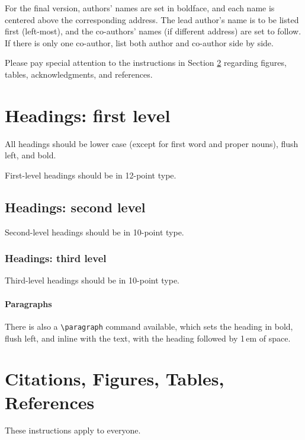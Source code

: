 \documentclass{article}
\begin{document}
For the final version, authors' names are set in boldface, and each name is centered above the corresponding address. The lead author's name is to be listed first (left-most), and the co-authors' names (if different address) are set to follow. If there is only one co-author, list both author and co-author side by side.

Please pay special attention to the instructions in Section \ref{others} regarding figures, tables, acknowledgments, and references.

\section{Headings: first level}
\label{headings}

All headings should be lower case (except for first word and proper nouns),
flush left, and bold.

First-level headings should be in 12-point type.

\subsection{Headings: second level}

Second-level headings should be in 10-point type.

\subsubsection{Headings: third level}

Third-level headings should be in 10-point type.

\paragraph{Paragraphs}

There is also a \verb+\paragraph+ command available, which sets the heading in bold, flush left, and inline with the text, with the heading followed by 1\,em of space.

\section{Citations, Figures, Tables, References}
\label{others}

These instructions apply to everyone.
\end{document}
